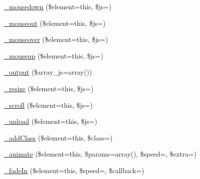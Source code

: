 \begin{DoxyCompactItemize}
\item 
\mbox{\hyperlink{class_c_i___jquery_a95cb3f44c2413b0fbe51734b346f4d92}{\+\_\+mousedown}} (\$element=\textquotesingle{}this\textquotesingle{}, \$js=\textquotesingle{}\textquotesingle{})
\item 
\mbox{\hyperlink{class_c_i___jquery_a8a575b3b64cda3a24434e8fed1553124}{\+\_\+mouseout}} (\$element=\textquotesingle{}this\textquotesingle{}, \$js=\textquotesingle{}\textquotesingle{})
\item 
\mbox{\hyperlink{class_c_i___jquery_abe38c17415cf07abb6de435525676dca}{\+\_\+mouseover}} (\$element=\textquotesingle{}this\textquotesingle{}, \$js=\textquotesingle{}\textquotesingle{})
\item 
\mbox{\hyperlink{class_c_i___jquery_a78d654cce0aaa6de766809e56b727261}{\+\_\+mouseup}} (\$element=\textquotesingle{}this\textquotesingle{}, \$js=\textquotesingle{}\textquotesingle{})
\item 
\mbox{\hyperlink{class_c_i___jquery_a6a837913fb7adb3e611aa97a89d56a6e}{\+\_\+output}} (\$array\+\_\+js=array())
\item 
\mbox{\hyperlink{class_c_i___jquery_a6a056a14d5944d85fa6e198c609df475}{\+\_\+resize}} (\$element=\textquotesingle{}this\textquotesingle{}, \$js=\textquotesingle{}\textquotesingle{})
\item 
\mbox{\hyperlink{class_c_i___jquery_a8242a35dd382dd24e4bb7eaba2be2982}{\+\_\+scroll}} (\$element=\textquotesingle{}this\textquotesingle{}, \$js=\textquotesingle{}\textquotesingle{})
\item 
\mbox{\hyperlink{class_c_i___jquery_a967b2d5e889abc76a2389f2c34df14f7}{\+\_\+unload}} (\$element=\textquotesingle{}this\textquotesingle{}, \$js=\textquotesingle{}\textquotesingle{})
\item 
\mbox{\hyperlink{class_c_i___jquery_ac51392df39f9adbe6638324664c6319e}{\+\_\+add\+Class}} (\$element=\textquotesingle{}this\textquotesingle{}, \$class=\textquotesingle{}\textquotesingle{})
\item 
\mbox{\hyperlink{class_c_i___jquery_a0bec4feda29c0c883eccf40af8545c8c}{\+\_\+animate}} (\$element=\textquotesingle{}this\textquotesingle{}, \$params=array(), \$speed=\textquotesingle{}\textquotesingle{}, \$extra=\textquotesingle{}\textquotesingle{})
\item 
\mbox{\hyperlink{class_c_i___jquery_a2d323b3e6a8e62d1a940cbf58e216992}{\+\_\+fade\+In}} (\$element=\textquotesingle{}this\textquotesingle{}, \$speed=\textquotesingle{}\textquotesingle{}, \$callback=\textquotesingle{}\textquotesingle{})
\item 

\end{DoxyCompactItemize}
